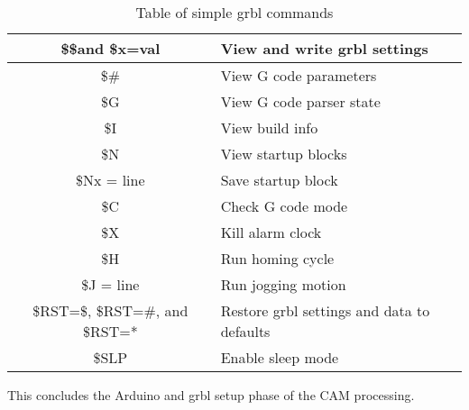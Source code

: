 \begin{table}[h]
 \begin{center}
  \caption{Table of simple grbl commands}
  \begin{tabular}{|c|l|}
   \hline
   \$\$and \$x=val                 & View and write grbl settings               \\
   \hline
   \$\#                            & View G code parameters                     \\
   \hline
   \$G                             & View G code parser state                   \\
   \hline
   \$I                             & View build info                            \\
   \hline
   \$N                             & View startup blocks                        \\
   \hline
   \$Nx = line                     & Save startup block                         \\
   \hline
   \$C                             & Check G code mode                          \\
   \hline
   \$X                             & Kill alarm clock                           \\
   \hline
   \$H                             & Run homing cycle                           \\
   \hline
   \$J = line                      & Run jogging motion                         \\
   \hline
   \$RST=\$, \$RST=\#, and \$RST=* & Restore grbl settings and data to defaults \\
   \hline
   \$SLP                           & Enable sleep mode                          \\
   \hline
  \end{tabular}
 \end{center}
 \label{tab:grbl_cmds}
\end{table}


This concludes the Arduino and grbl setup phase of the CAM processing.

